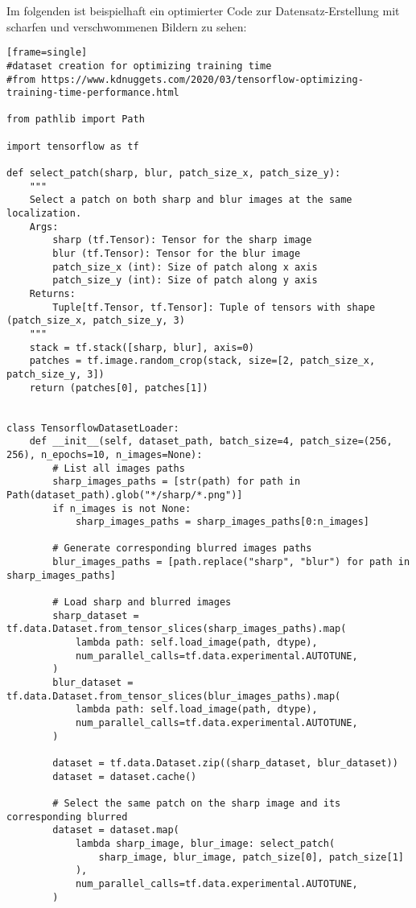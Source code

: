 Im folgenden ist beispielhaft ein optimierter Code zur Datensatz-Erstellung mit scharfen und verschwommenen Bildern zu sehen:

\begin{verbatim}[frame=single]
#dataset creation for optimizing training time
#from https://www.kdnuggets.com/2020/03/tensorflow-optimizing-training-time-performance.html

from pathlib import Path

import tensorflow as tf

def select_patch(sharp, blur, patch_size_x, patch_size_y):
    """
    Select a patch on both sharp and blur images at the same localization.
    Args:
        sharp (tf.Tensor): Tensor for the sharp image
        blur (tf.Tensor): Tensor for the blur image
        patch_size_x (int): Size of patch along x axis
        patch_size_y (int): Size of patch along y axis
    Returns:
        Tuple[tf.Tensor, tf.Tensor]: Tuple of tensors with shape (patch_size_x, patch_size_y, 3)
    """
    stack = tf.stack([sharp, blur], axis=0)
    patches = tf.image.random_crop(stack, size=[2, patch_size_x, patch_size_y, 3])
    return (patches[0], patches[1])


class TensorflowDatasetLoader:
    def __init__(self, dataset_path, batch_size=4, patch_size=(256, 256), n_epochs=10, n_images=None):
        # List all images paths
        sharp_images_paths = [str(path) for path in Path(dataset_path).glob("*/sharp/*.png")]
        if n_images is not None:
            sharp_images_paths = sharp_images_paths[0:n_images]

        # Generate corresponding blurred images paths
        blur_images_paths = [path.replace("sharp", "blur") for path in sharp_images_paths]

        # Load sharp and blurred images
        sharp_dataset = tf.data.Dataset.from_tensor_slices(sharp_images_paths).map(
            lambda path: self.load_image(path, dtype),
            num_parallel_calls=tf.data.experimental.AUTOTUNE,
        )
        blur_dataset = tf.data.Dataset.from_tensor_slices(blur_images_paths).map(
            lambda path: self.load_image(path, dtype),
            num_parallel_calls=tf.data.experimental.AUTOTUNE,
        )

        dataset = tf.data.Dataset.zip((sharp_dataset, blur_dataset))
        dataset = dataset.cache()

        # Select the same patch on the sharp image and its corresponding blurred
        dataset = dataset.map(
            lambda sharp_image, blur_image: select_patch(
                sharp_image, blur_image, patch_size[0], patch_size[1]
            ),
            num_parallel_calls=tf.data.experimental.AUTOTUNE,
        )


\end{verbatim}
